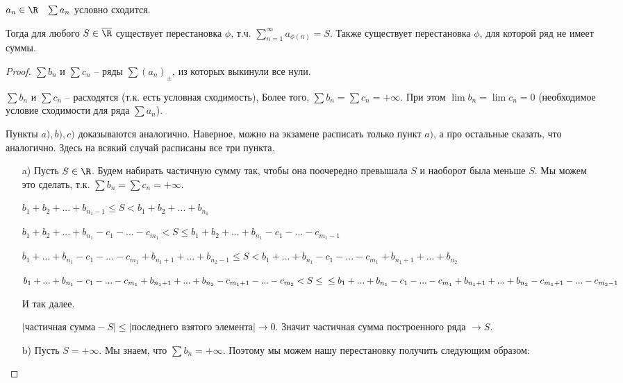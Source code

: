 \begin{theorem}[Римана]  \thmslashn
	
	$a_n \in \R \;\;\; \sum a_n$ условно сходится.
	
	Тогда для любого $S \in \overline{\R}$ существует перестановка $\phi$, т.ч. $\sum\limits_{n = 1}^{\infty}a_{\phi(n)} = S$. Также существует перестановка $\phi$, для которой ряд не имеет суммы.
\end{theorem}

\begin{proof}  \thmslashn
	
	$\sum b_n$ и $\sum c_n$ -- ряды $\sum (a_n)_{\pm}$, из которых выкинули все нули.
	
	$\sum b_n$ и $\sum c_n$ -- расходятся (т.к. есть условная сходимость), Более того, $\sum b_n = \sum c_n = +\infty$. При этом $\lim b_n = \lim c_n = 0$ (необходимое условие сходимости для ряда $\sum a_n$).
	
	Пункты $a), b), c)$ доказываются аналогично. Наверное, можно на экзамене расписать только пункт $a)$, а про остальные сказать, что аналогично. Здесь на всякий случай расписаны все три пункта.
	\begin{enumerate}
	
	\item[a)] Пусть $S \in \R$. Будем набирать частичную сумму так, чтобы она поочередно превышала $S$ и наоборот была меньше $S$. Мы можем это сделать, т.к. $\sum b_n = \sum c_n = +\infty$.
	
	$b_1+b_2+...+b_{n_1 - 1} \le S < b_1 + b_2 + ... + b_{n_1}$ 
	
	$b_1+b_2+...+b_{n_1} -c_1-...-c_{m_1} < S\le b_1+b_2+...+b_{n_1}-c_1-...-c_{m_1 - 1}$
	
	$b_1+...+b_{n_1}-c_1-...-c_{m_1} + b_{n_1+1} + ...+b_{n_2 - 1} \le S < b_1+...+b_{n_1}-c_1-...-c_{m_1} + b_{n_1+1} + ...+b_{n_2}$
	
	$b_1+...+b_{n_1}-c_1-...-c_{m_1} + b_{n_1+1} + ...+b_{n_2} - c_{m_1+1}-...-c_{m_2} < S \le\\\le b_1+...+b_{n_1}-c_1-...-c_{m_1} + b_{n_1+1} + ...+b_{n_2}-c_{m_1+1}-...-c_{m_2-1}$
	
	
	И так далее.
	
	$|\text{частичная сумма} - S| \le |\text{последнего взятого элемента}| \to 0$. Значит частичная сумма построенного ряда $\to S$.
	
	\item[b)] Пусть $S = +\infty$. Мы знаем, что $\sum b_n = +\infty$. Поэтому мы можем нашу перестановку получить следующим образом:
	

\end{enumerate}
\end{proof}
